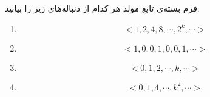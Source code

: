 \EXERCISE
فرم بسته‌ی تابع مولد هر کدام از دنباله‌های زیر را بیابید:
\begin{enumerate}
\item
$$<1, 2, 4, 8, \cdots, 2^k, \cdots>$$
\item
$$<1, 0, 0, 1, 0, 0, 1, \cdots>$$
\item
$$<0, 1, 2, \cdots, k, \cdots>$$
\item
$$<0, 1, 4, \cdots, k^2, \cdots>$$
\end{enumerate}